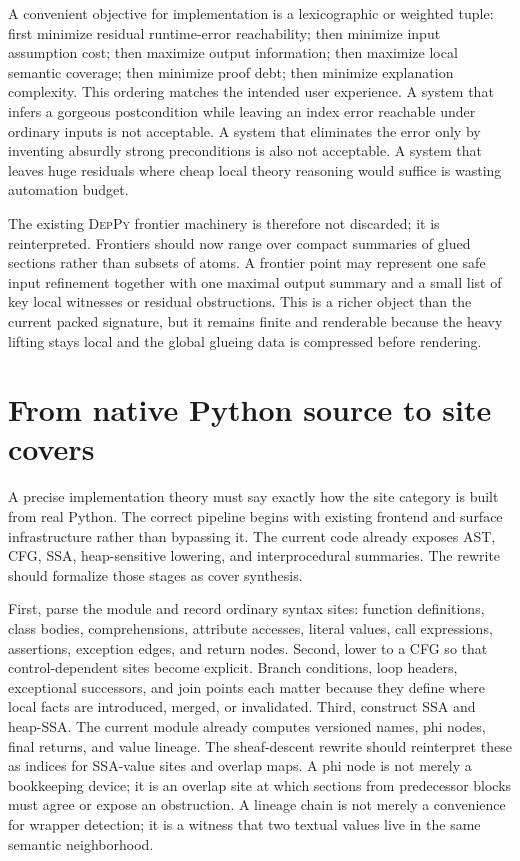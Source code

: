 \documentclass[11pt]{report}
\newcommand{\DepPy}{\textsc{DepPy}}
\DeclareRobustCommand{\py}[1]{\texttt{\detokenize{#1}}}
\theoremstyle{definition}
\theoremstyle{plain}
\begin{document}
A convenient objective for implementation is a lexicographic or weighted tuple:
first minimize residual runtime-error reachability; then minimize input
assumption cost; then maximize output information; then maximize local semantic
coverage; then minimize proof debt; then minimize explanation complexity. This
ordering matches the intended user experience. A system that infers a gorgeous
postcondition while leaving an index error reachable under ordinary inputs is not
acceptable. A system that eliminates the error only by inventing absurdly strong
preconditions is also not acceptable. A system that leaves huge residuals where
cheap local theory reasoning would suffice is wasting automation budget.

The existing \DepPy{} frontier machinery is therefore not discarded; it is
reinterpreted. Frontiers should now range over compact summaries of glued
sections rather than subsets of atoms. A frontier point may represent one safe
input refinement together with one maximal output summary and a small list of
key local witnesses or residual obstructions. This is a richer object than the
current packed signature, but it remains finite and renderable because the heavy
lifting stays local and the global glueing data is compressed before rendering.


\section{From native Python source to site covers}

A precise implementation theory must say exactly how the site category is built
from real Python. The correct pipeline begins with existing frontend and surface
infrastructure rather than bypassing it. The current code already exposes AST,
CFG, SSA, heap-sensitive lowering, and interprocedural summaries. The rewrite
should formalize those stages as cover synthesis.

First, parse the module and record ordinary syntax sites: function definitions,
class bodies, comprehensions, attribute accesses, literal values, call
expressions, assertions, exception edges, and return nodes. Second, lower to a
CFG so that control-dependent sites become explicit. Branch conditions, loop
headers, exceptional successors, and join points each matter because they define
where local facts are introduced, merged, or invalidated. Third, construct SSA
and heap-SSA. The current module \py{src/deppy/surface/python_ssa.py}
already computes versioned names, phi nodes, final returns, and value lineage.
The sheaf-descent rewrite should reinterpret these as indices for SSA-value
sites and overlap maps. A phi node is not merely a bookkeeping device; it is an
overlap site at which sections from predecessor blocks must agree or expose an
obstruction. A lineage chain is not merely a convenience for wrapper detection;
it is a witness that two textual values live in the same semantic neighborhood.
\end{document}
